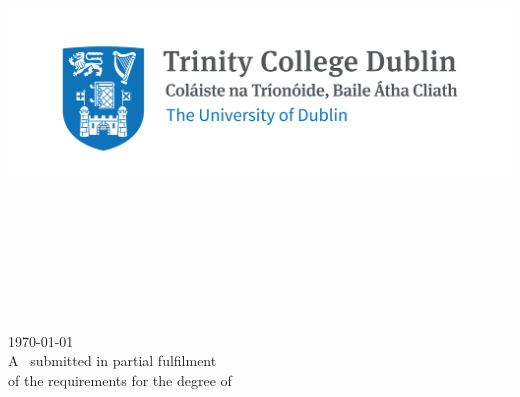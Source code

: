 \begin{titlepage}

\center
\includegraphics{title/logo_col.png}\\[1cm] 
\Large \school\\[1.5cm]
\ifdefined\department
\large \department\\[1.5cm]
\fi

\makeatletter
{ \huge \bfseries \thesistitle}\\[1.5cm]
    
\ifdefined\authorid
\authorname\\
\authorid\\[2cm]
\else
\authorname\\[2cm]
\fi

{\large \today}\\[2cm]
    
\vfill
    A \typeofthesis\ submitted in partial fulfilment\\of the requirements for the degree of\\
\degree

\vfill

\end{titlepage}
